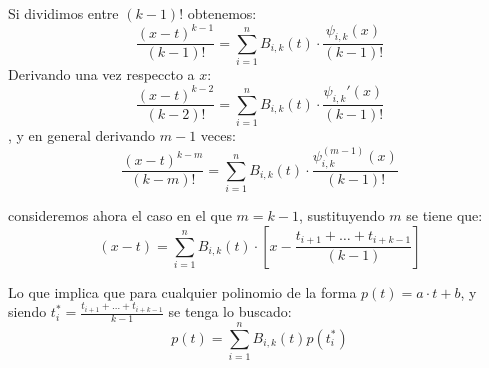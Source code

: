 \documentclass[12pt,a4paper]{article}
\begin{document}
\begin{enumerate}
  Si dividimos entre $(k-1)!$ obtenemos:
  $$\frac{(x-t)^{k-1}}{(k-1)!}=\sum\limits_{i=1}^{n}B_{i,k}(t)\cdot\frac{\psi_{i,k}(x)}{(k-1)!}$$
  Derivando una vez respeccto a $x$:
  $$\frac{(x-t)^{k-2}}{(k-2)!}=\sum\limits_{i=1}^{n}B_{i,k}(t)\cdot\frac{\psi_{i,k}'(x)}{(k-1)!}$$,
  y en general derivando $m-1$ veces:
  $$\frac{(x-t)^{k-m}}{(k-m)!}=\sum\limits_{i=1}^{n}B_{i,k}(t)\cdot\frac{\psi_{i,k}^{(m-1)}(x)}{(k-1)!}$$


  consideremos ahora el caso en el que $m=k-1$, sustituyendo $m$ se tiene
  que:
  $$(x-t)=\sum\limits_{i=1}^{n}B_{i,k}(t)\cdot\left[x-\frac{t_{i+1}+\dots+t_{i+k-1}}{(k-1)}\right]$$

  Lo que implica que para cualquier polinomio de la forma
  $p(t)=a \cdot t + b$, y siendo
  $t_{i}^{*}=\frac{t_{i+1}+\dots+t_{i+k-1}}{k-1}$ se tenga lo buscado:
  $$p(t)=\sum\limits_{i=1}^{n}B_{i,k}(t)p(t_{i}^{*})$$



\end{enumerate} 
\end{document}
